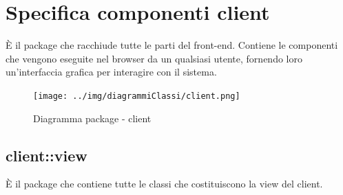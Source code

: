 \section{Specifica componenti client}
È il package che racchiude tutte le parti del front-end. Contiene le componenti che vengono eseguite nel browser da un qualsiasi utente, fornendo loro un’interfaccia grafica per interagire con il sistema.\begin{center}
	\begin{figure}[H]
		\centering \texttt{[image: ../img/diagrammiClassi/client.png]}
		\caption{Diagramma package - client}
	\end{figure}
\end{center}\subsection{client::view}
È il package che contiene tutte le classi che costituiscono la view del client. 
